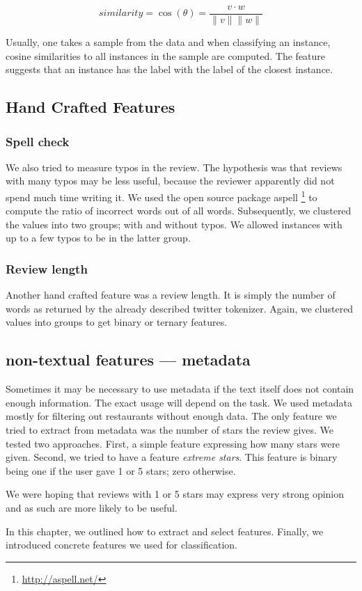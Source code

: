 \[
	\mathit{similarity} = \cos\left(\theta\right) = \frac{v \cdot w}{\|v\| \| w \|}
\]

Usually, one takes a sample from the data and when classifying an instance,
cosine similarities to all instances in the sample are computed.
The feature suggests that an instance has the label with the label of the closest instance.



\subsection{Hand Crafted Features}

\subsubsection{Spell check}

We also tried to measure typos in the review.
The hypothesis was that reviews with many typos may be less useful,
because the reviewer apparently did not spend much time writing it.
We used the open source package aspell \footnote{\url{http://aspell.net/}}
to compute the ratio of incorrect words out of all words.
Subsequently, we clustered the values into two groups; with and without typos.
We allowed instances with up to a few typos to be in the latter group.


\subsubsection{Review length}

Another hand crafted feature was a review length.
It is simply the number of words as returned by the already described twitter tokenizer.
Again, we clustered values into groups to get binary or ternary features.


\subsection{non-textual features --- metadata}

Sometimes it may be necessary to use metadata
if the text itself does not contain enough information.
The exact usage will depend on the task.
We used metadata mostly for filtering out restaurants without enough data.
The only feature we tried to extract from metadata was the number of stars the review gives.
We tested two approaches.
First, a simple feature expressing how many stars were given.
Second, we tried to have a feature \textit{extreme stars}.
This feature is binary being one if the user gave 1 or 5 stars;
zero otherwise.

We were hoping that reviews with 1 or 5 stars may express very strong opinion
and as such are more likely to be useful.

In this chapter, we outlined how to extract and select features.
Finally, we introduced concrete features we used for classification.
